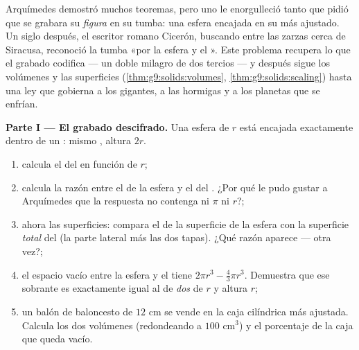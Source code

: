 \begin{problem}
\label{pb:g9:solids:1}
Arquímedes demostró muchos teoremas, pero uno le enorgulleció tanto que
pidió que se grabara su \emph{figura} en su tumba: una esfera
encajada en su  más ajustado. Un siglo después, el escritor romano
Cicerón, buscando entre las zarzas cerca de Siracusa, reconoció la
tumba «por la esfera y el ». Este problema recupera
lo que el grabado codifica --- un doble milagro de dos tercios --- y después
sigue los volúmenes y las superficies (\cref{thm:g9:solids:volumes},
\cref{thm:g9:solids:scaling}) hasta una ley que gobierna a los gigantes, a las hormigas
y a los planetas que se enfrían.

\medskip
\noindent\textbf{Parte I --- El grabado descifrado.}
Una esfera de  $r$ está encajada exactamente dentro de un : mismo
, altura $2r$.
\begin{enumerate}
  \item calcula el  del  en función de $r$;
  \item calcula la razón entre el  de la esfera y el del
        . ¿Por qué le pudo gustar a Arquímedes que la
        respuesta no contenga ni $\pi$ ni $r$?;
  \item ahora las superficies: compara el  de la superficie de la esfera con
        la superficie \emph{total} del  (la parte lateral más
        las dos tapas). ¿Qué razón aparece --- otra vez?;
  \item el espacio vacío entre la esfera y el  tiene 
        $2\pi r^3 - \frac43\pi r^3$. Demuestra que ese sobrante
        es exactamente igual al  de \emph{dos } de 
        $r$ y altura $r$;
  \item un balón de baloncesto de  $12$ cm se vende en la caja
        cilíndrica más ajustada. Calcula los dos volúmenes (redondeando a
        $100$ cm$^3$) y el porcentaje de la caja que queda
        vacío.
\end{enumerate}


\end{problem}
